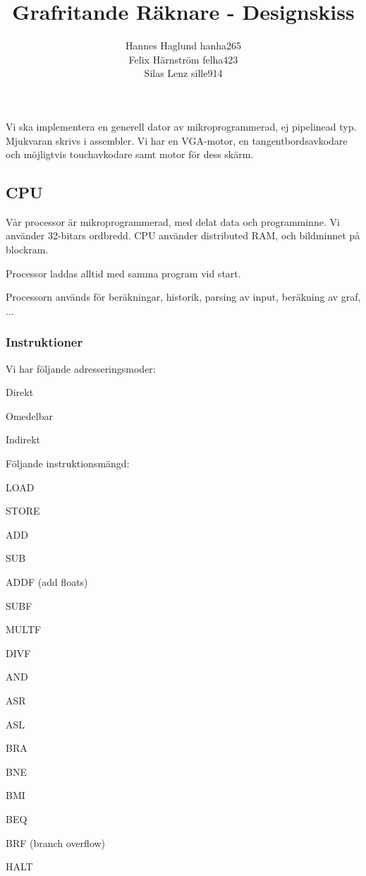 \documentclass[]{article}
\title{Grafritande Räknare - Designskiss}
\author{Hannes Haglund hanha265\\Felix Härnström felha423\\Silas Lenz sille914}
\begin{document}
\maketitle
\newpage

\section{}
Vi ska implementera en generell dator av mikroprogrammerad, ej pipelinead typ. Mjukvaran skrivs i assembler. Vi har en VGA-motor, en tangentbordsavkodare och möjligtvis touchavkodare samt motor för dess skärm. 

\subsection{CPU}
Vår processor är mikroprogrammerad, med delat data och programminne. Vi använder 32-bitars ordbredd. CPU använder distributed RAM, och bildminnet på blockram. 

Processor laddas alltid med samma program vid start. 

Processorn används för beräkningar, historik, parsing av input, beräkning av graf, ...

\subsubsection{Instruktioner}
Vi har följande adresseringsmoder:
\begin{itemize*}
\item Direkt
\item Omedelbar
\item Indirekt 
\end{itemize*}
Följande instruktionsmängd:
\begin{itemize*}
\item LOAD
\item STORE
\item ADD
\item SUB
\item ADDF (add floats)
\item SUBF
\item MULTF
\item DIVF
\item AND
\item ASR
\item ASL
\item BRA
\item BNE
\item BMI
\item BEQ
\item BRF (branch overflow)
\item HALT	
\end{itemize*}
\end{document}

